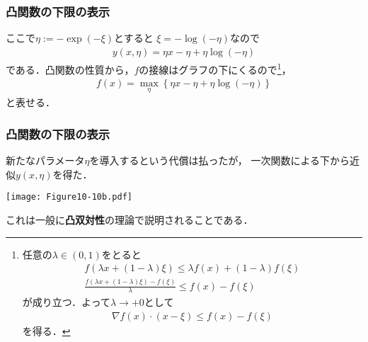 \documentclass[10pt,hyperref={unicode}]{beamer}
\newcommand{\parentheses}[1]{\left(#1\right)}
\newcommand{\braces}[1]{\left\{#1\right\}}
\begin{document}
\begin{frame}
\frametitle{凸関数の下限の表示}
ここで$\eta := -\exp\parentheses{-\xi}$とすると
$\xi = -\log \parentheses{-\eta}$なので
\begin{align}
    y\parentheses{x,\eta} = \eta x - \eta + \eta\log\parentheses{-\eta} \tag{10.127}
\end{align}
である．凸関数の性質から，$f$の接線はグラフの下にくるので\footnote[frame]{%
任意の$\lambda \in \parentheses{0,1}$をとると
\begin{gather*}
f\parentheses{\lambda x + \parentheses{1 - \lambda}\xi} \leq \lambda f\parentheses{x} + \parentheses{1 - \lambda}f\parentheses{\xi}\\
\frac{f\parentheses{\lambda x + \parentheses{1 - \lambda}\xi} - f\parentheses{\xi}}{\lambda} \leq f\parentheses{x} - f\parentheses{\xi}
\end{gather*}
が成り立つ．よって$\lambda \to +0$として
\begin{align*}
    \nabla f\parentheses{x} \cdot \parentheses{x - \xi} \leq f\parentheses{x} - f\parentheses{\xi}
\end{align*}
を得る．
}，
\begin{align}
    f\parentheses{x} = \max_\eta \braces{\eta x  - \eta + \eta \log\parentheses{- \eta}} \tag{10.128}
\end{align}
と表せる．
\end{frame}

\begin{frame}
\frametitle{凸関数の下限の表示}
新たなパラメータ$\eta$を導入するという代償は払ったが，
一次関数による下から近似$y\parentheses{x,\eta}$を得た．

\smallskip

\begin{center}
    \texttt{[image: Figure10-10b.pdf]}
\end{center}

\smallskip

これは一般に\textbf{凸双対性}の理論で説明されることである．
\end{frame}
\end{document}
